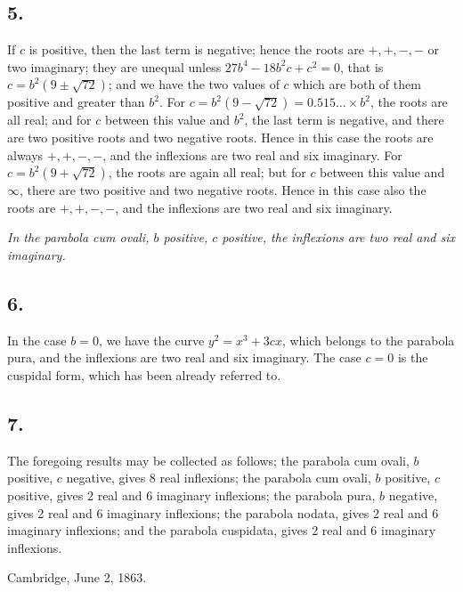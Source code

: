 \documentclass[11pt,a4paper]{article}
\theoremstyle{definition}
\begin{document}
\subsection*{5.}

If $c$ is positive, then the last term is negative; hence the roots are $+, +, -, -$ or
two imaginary; they are unequal unless $27b^{4} - 18b^{2}c + c^{2} = 0$, that is $c = b^{2}(9 \pm \sqrt{72})$;
and we have the two values of $c$ which are both of them positive and greater than $b^{2}$.
For $c = b^{2}(9 - \sqrt{72}) = 0.515\ldots \times b^{2}$, the roots are all real; and for $c$ between this value
and $b^{2}$, the last term is negative, and there are two positive roots and two negative
roots. Hence in this case the roots are always $+, +, -, -$, and the inflexions are two
real and six imaginary. For $c = b^{2}(9 + \sqrt{72})$, the roots are again all real; but for $c$
between this value and $\infty$, there are two positive and two negative roots. Hence in
this case also the roots are $+, +, -, -$, and the inflexions are two real and six imaginary.

\textit{In the parabola cum ovali, $b$ positive, $c$ positive, the inflexions are two real and six
imaginary.}

\subsection*{6.}

In the case $b = 0$, we have the curve $y^{2} = x^{3} + 3cx$, which belongs to the parabola
pura, and the inflexions are two real and six imaginary. The case $c = 0$ is the cuspidal
form, which has been already referred to.

\newpage
\subsection*{7.}

The foregoing results may be collected as follows; the parabola cum ovali, $b$ positive,
$c$ negative, gives 8 real inflexions; the parabola cum ovali, $b$ positive, $c$ positive,
gives 2 real and 6 imaginary inflexions; the parabola pura, $b$ negative, gives 2 real
and 6 imaginary inflexions; the parabola nodata, gives 2 real and 6 imaginary inflexions;
and the parabola cuspidata, gives 2 real and 6 imaginary inflexions.

\vspace{1em}
\noindent
Cambridge, June 2, 1863.

\newpage
\end{document}

